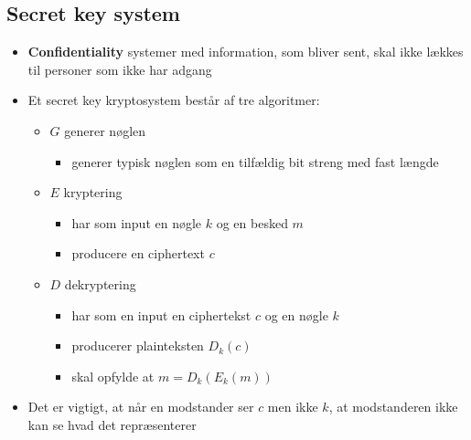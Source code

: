 \documentclass[a4, english]{article}
\begin{document}
\subsection{Secret key system}
\begin{itemize}
  \item \textbf{Confidentiality} systemer med information, som bliver sent, skal ikke lækkes til personer som ikke har adgang
	\item Et secret key kryptosystem består af tre algoritmer:
  \begin{itemize}
  	\item $G$ generer nøglen
    \begin{itemize}
    	\item generer typisk nøglen som en tilfældig bit streng med fast længde 
    \end{itemize}
    \item $E$ kryptering
    \begin{itemize}
    	\item har som input en nøgle $k$ og en besked $m$ 
      \item producere en ciphertext $c$ 
    \end{itemize}
    \item $D$ dekryptering
    \begin{itemize}
    	\item har som en input en ciphertekst $c$ og en nøgle $k$ 
      \item producerer plainteksten $D_k(c)$ 
      \item skal opfylde at $m=D_k(E_k(m))$
    \end{itemize}
  \end{itemize}
  \item Det er vigtigt, at når en modstander ser $c$ men ikke $k$, at modstanderen ikke kan se hvad det repræsenterer  
\end{itemize}
\end{document}
